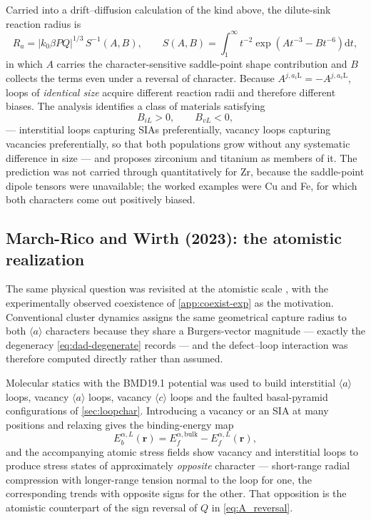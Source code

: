 \documentclass{article}
\newcommand{\aloop}{\ensuremath{\langle a\rangle}}
\newcommand{\cloop}{\ensuremath{\langle c\rangle}}
\newcommand{\aiL}{a_{i}\mathrm{L}}
\newcommand{\avL}{a_{v}\mathrm{L}}
\begin{document}
Carried into a drift--diffusion calculation of the kind above, the dilute-sink
reaction radius is
\begin{equation}
    R_a = |k_0\beta P Q|^{1/3}\,S^{-1}(A,B),
    \qquad
    S(A,B)=\int_1^\infty t^{-2}
    \exp\!\left(A t^{-3}-B t^{-6}\right)\mathrm{d}t ,
    \label{eq:reaction_radius}
\end{equation}
in which $A$ carries the character-sensitive saddle-point shape contribution and
$B$ collects the terms even under a reversal of character. Because
$A^{j,\aiL}=-A^{j,\avL}$, loops of \emph{identical size} acquire different
reaction radii and therefore different biases. The analysis identifies a class of
materials satisfying
\begin{equation}
    \boxed{\;B_{iL}>0,\qquad B_{vL}<0,\;}
    \label{eq:woo_zr_class}
\end{equation}
--- interstitial loops capturing SIAs preferentially, vacancy loops capturing
vacancies preferentially, so that both populations grow without any systematic
difference in size --- and proposes zirconium and titanium as members of it. The
prediction was not carried through quantitatively for Zr, because the
saddle-point dipole tensors were unavailable; the worked examples were Cu and Fe,
for which both characters come out positively biased.

\subsection{March-Rico and Wirth (2023): the atomistic realization}

The same physical question was revisited at the atomistic scale
\citep{marchrico2023}, with the experimentally observed coexistence of
\cref{app:coexist-exp} as the motivation. Conventional cluster dynamics assigns
the same geometrical capture radius to both \aloop{} characters because they
share a Burgers-vector magnitude --- exactly the degeneracy
\cref{eq:dad-degenerate} records --- and the defect--loop interaction was
therefore computed directly rather than assumed.

Molecular statics with the BMD19.1 potential was used to build interstitial
\aloop{} loops, vacancy \aloop{} loops, vacancy \cloop{} loops and the faulted
basal-pyramid configurations of \cref{sec:loopchar}. Introducing a vacancy or an
SIA at many positions and relaxing gives the binding-energy map
\begin{equation}
    E_b^{\alpha,L}(\bm r)
    =E_f^{\alpha,\mathrm{bulk}}-E_f^{\alpha,L}(\bm r),
    \label{eq:binding_energy}
\end{equation}
and the accompanying atomic stress fields show vacancy and interstitial loops to
produce stress states of approximately \emph{opposite} character --- short-range
radial compression with longer-range tension normal to the loop for one, the
corresponding trends with opposite signs for the other. That opposition is the
atomistic counterpart of the sign reversal of $Q$ in \cref{eq:A_reversal}.
\end{document}
